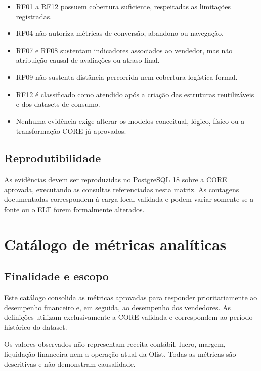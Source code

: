 \documentclass[12pt,a4paper]{article}
\providecommand{\tightlist}{
  \setlength{\itemsep}{0pt}\setlength{\parskip}{0pt}
}
\begin{document}
\begin{itemize}
\tightlist
\item
  RF01 a RF12 possuem cobertura suficiente, respeitadas as limitações
  registradas.
\item
  RF04 não autoriza métricas de conversão, abandono ou navegação.
\item
  RF07 e RF08 sustentam indicadores associados ao vendedor, mas não
  atribuição causal de avaliações ou atraso final.
\item
  RF09 não sustenta distância percorrida nem cobertura logística formal.
\item
  RF12 é classificado como atendido após a criação das estruturas
  reutilizáveis e dos datasets de consumo.
\item
  Nenhuma evidência exige alterar os modelos conceitual, lógico, físico
  ou a transformação CORE já aprovados.
\end{itemize}

\subsection{Reprodutibilidade}\label{docs__analytics__matriz_validacao_requisitos_funcionais.md__reprodutibilidade}

As evidências devem ser reproduzidas no PostgreSQL 18 sobre a CORE
aprovada, executando as consultas referenciadas nesta matriz. As
contagens documentadas correspondem à carga local validada e podem
variar somente se a fonte ou o ELT forem formalmente alterados.

\section{Catálogo de métricas
analíticas}\label{docs__analytics__catalogo_metricas_analiticas.md__catuxe1logo-de-muxe9tricas-analuxedticas}

\subsection{Finalidade e
escopo}\label{docs__analytics__catalogo_metricas_analiticas.md__finalidade-e-escopo}

Este catálogo consolida as métricas aprovadas para responder
prioritariamente ao desempenho financeiro e, em seguida, ao desempenho
dos vendedores. As definições utilizam exclusivamente a CORE validada e
correspondem ao período histórico do dataset.

Os valores observados não representam receita contábil, lucro, margem,
liquidação financeira nem a operação atual da Olist. Todas as métricas
são descritivas e não demonstram causalidade.
\end{document}
